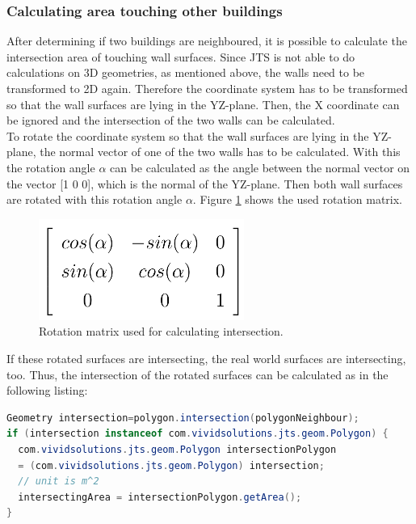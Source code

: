 \subsubsection{Calculating area touching other buildings}
After determining if two buildings are neighboured, it is possible to calculate the intersection area of touching wall surfaces. Since JTS is not able to do calculations on 3D geometries, as mentioned above, the walls need to be transformed to 2D again. Therefore the coordinate system has to be transformed so that the wall surfaces are lying in the YZ-plane. Then, the X coordinate can be ignored and the intersection of the two walls can be calculated.\\
To rotate the coordinate system so that the wall surfaces are lying in the YZ-plane, the normal vector of one of the two walls has to be calculated. With this the rotation angle $\alpha$ can be calculated as the angle between the normal vector on the vector [1 0 0], which is the normal of the YZ-plane. Then both wall surfaces are rotated with this rotation angle $\alpha$. Figure \ref{fig:rotation_matrix} shows the used rotation matrix.
\begin{figure}[h]
	\centering
 	 \includegraphics[scale=0.5]{phase1/group1/rotation_matrix.png}
	\caption{Rotation matrix used for calculating intersection.}
	\label{fig:rotation_matrix}
\end{figure}
If these rotated surfaces are intersecting, the real world surfaces are intersecting, too. Thus, the intersection of the rotated surfaces can be calculated as in the following listing:\\
\begin{lstlisting}[language=Java]
Geometry intersection=polygon.intersection(polygonNeighbour);
if (intersection instanceof com.vividsolutions.jts.geom.Polygon) {
  com.vividsolutions.jts.geom.Polygon intersectionPolygon 
  = (com.vividsolutions.jts.geom.Polygon) intersection;
  // unit is m^2
  intersectingArea = intersectionPolygon.getArea();
}
\end{lstlisting}

